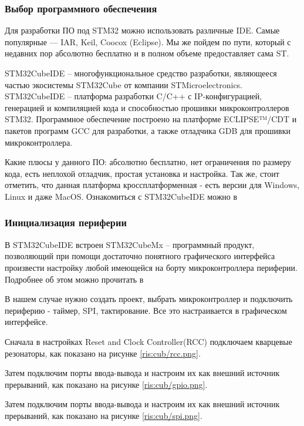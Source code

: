 \begin{sloppypar}
\subsubsection{Выбор программного обеспечения}
Для разработки ПО под STM32 можно использовать различные IDE. Самые популярные — IAR, Keil, Coocox (Eclipse). Мы же пойдем по пути, который с недавних пор абсолютно бесплатно и в полном объеме предоставляет сама ST.


STM32CubeIDE – многофункциональное средство разработки, являющееся частью экосистемы STM32Cube от компании STMicroelectronics.
STM32CubeIDE – платформа разработки C/C++ с IP-конфигурацией, генерацией и компиляцией кода и способностью прошивки микроконтроллеров STM32.
Программное обеспечение построено на платформе ECLIPSE™/CDT и пакетов программ GCC для разработки, а также отладчика GDB для прошивки микроконтроллера.


Какие плюсы у данного ПО: абсолютно бесплатно, нет ограничения по размеру кода, есть неплохой отладчик, простая установка и настройка. Так же, стоит отметить, что данная платформа кроссплатформенная - есть версии для Windows, Linux и даже MacOS. Ознакомиться с STM32CubeIDE можно в \cite{STM32CubeIDE}

\subsubsection{Инициализация периферии}
В STM32CubeIDE встроен STM32CubeMx -- программный продукт, позволяющий при помощи достаточно понятного графического интерфейса произвести настройку любой имеющейся на борту микроконтроллера периферии. Подробнее об этом можно прочитать в \cite{cube}

В нашем случае нужно создать проект, выбрать микроконтроллер и подключить периферию - таймер, SPI, тактирование. Все это настраивается в графическом интерфейсе.

Сначала в настройках Reset and Clock Controller(RCC) подключаем кварцевые резонаторы, как показано на рисунке \ref{ris:cub/rcc.png}.

Затем подключим порты ввода-вывода и настроим их как внешний источник прерываний, как показано на рисунке \ref{ris:cub/gpio.png}.

Затем подключим порты ввода-вывода и настроим их как внешний источник прерываний, как показано на рисунке \ref{ris:cub/spi.png}.


\end{sloppypar}
